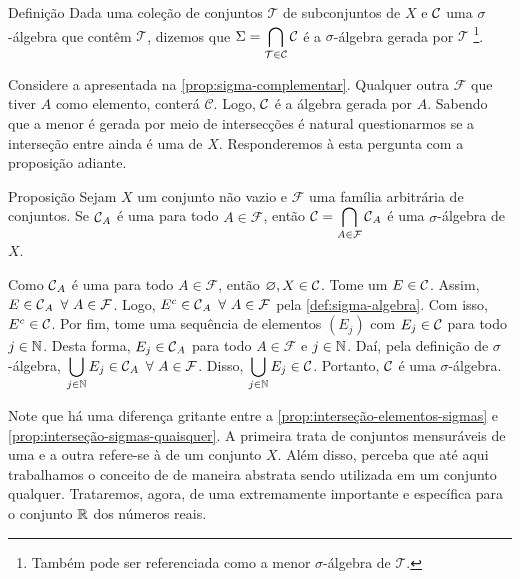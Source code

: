 \begin{env}{Definição}
	\label{deff: sigma algebra gerada}
	Dada uma coleção de conjuntos $\mathcal{T}$ de subconjuntos de $X$ e $\operatorname{\mathcal{C}}$ uma $\sigma$-álgebra que contêm $\mathcal{T}$, dizemos que
	$
	\Sigma = \displaystyle \bigcap_{\mathcal{T} \in \operatorname{\mathcal{C}} } \operatorname{\mathcal{C}}
	$
	é a $\sigma$-álgebra gerada por $\mathcal{T}$
	\footnote{Também pode ser referenciada como a menor $\sigma$-álgebra de $\mathcal{T}$.}.
\end{env}

Considere a \sigal apresentada na \ref{prop:sigma-complementar}. 
Qualquer outra \sigal $\mathcal{F}$ que tiver $A$ como elemento, conterá $\mathcal{C}$.
Logo, $\operatorname{\mathcal{C}}$ é a álgebra gerada por $A$.
Sabendo que a menor \sigal é gerada por meio de intersecções é natural questionarmos se a interseção entre \sigals ainda é uma \sigal de $X$.
Responderemos à esta pergunta com a proposição adiante.
\vspace{-0.1cm}
\begin{env}{Proposição}
\label{prop:interseção-sigmas-quaisquer}
    Sejam $X$ um conjunto não vazio e $\mathcal{F}$ uma família arbitrária de conjuntos.
    Se $\operatorname{\mathcal{C}}_A$ é uma \sigal para todo $A \in \mathcal{F}$, então
    $
    \displaystyle \operatorname{\mathcal{C}} = \bigcap_{A \in \mathcal{F}} \operatorname{\mathcal{C}}_A$ é uma $\sigma$-álgebra de $X$. 
\end{env}
\begin{prova}
    Como $\operatorname{\mathcal{C}}_A$ é uma \sigal para todo $A \in \mathcal{F}$, então 
    $\varnothing, X \in \operatorname{\mathcal{C}}$.
    Tome um $E \in \operatorname{\mathcal{C}}$. 
    Assim, $E \in \operatorname{\mathcal{C}}_A\ \forall\  A \in \mathcal{F}$.
    Logo, $E^c \in \operatorname{\mathcal{C}}_A\ \forall\  A \in \mathcal{F}$ pela \ref{def:sigma-algebra}.
    Com isso, $E^c \in \operatorname{\mathcal{C}}$.
    Por fim, tome uma sequência de elementos $(E_j)$ com $E_j \in \operatorname{\mathcal{C}}$ para todo $j \in \operatorname{\mathbb{N}}$.
    Desta forma, $E_j \in \operatorname{\mathcal{C}}_A$ para todo $A \in \mathcal{F}$ e $j \in \operatorname{\mathbb{N}}$.
    Daí, pela definição de $\sigma$-álgebra, 
    $\displaystyle\bigcup_{j \in \operatorname{\mathbb{N}}} E_j \in \operatorname{\mathcal{C}}_A \ \forall\ A \in \mathcal{F}$.
    Disso, $\displaystyle \bigcup_{j \in \operatorname{\mathbb{N}}} E_j \in \operatorname{\mathcal{C}}$.
    Portanto, $\operatorname{\mathcal{C}}$ é uma $\sigma$-álgebra.
    \vspace{-0.4cm}
\end{prova}

Note que há uma diferença gritante entre a \ref{prop:interseção-elementos-sigmas} e \ref{prop:interseção-sigmas-quaisquer}.
A primeira trata de conjuntos mensuráveis de uma \sigal e a outra refere-se à \sigals de um conjunto $X$.
Além disso, perceba que até aqui trabalhamos o conceito de \sigal de maneira abstrata sendo utilizada em um conjunto qualquer. 
Trataremos, agora, de uma \sigal extremamente importante e específica para o conjunto $\mathbb{R}$ dos números reais.

